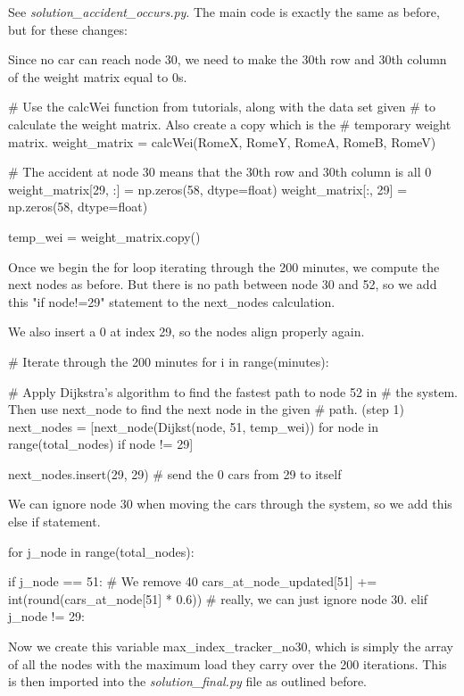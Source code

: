 \documentclass[paper=a4, fontsize=12pt]{scrartcl} %
\numberwithin{equation}{section}       %
\numberwithin{figure}{section}         %
\numberwithin{table}{section}          %
\begin{document}
\begin{enumerate}
See \textit{solution\_accident\_occurs.py}. The main code is exactly the same as before, but for these changes:

Since no car can reach node 30, we need to make the 30th row and 30th column of the weight matrix equal to 0s. 

\begin{python}
# Use the calcWei function from tutorials, along with the data set given
# to calculate the weight matrix. Also create a copy which is the
# temporary weight matrix.
weight_matrix = calcWei(RomeX, RomeY, RomeA, RomeB, RomeV)

# The accident at node 30 means that the 30th row and 30th column is all 0
weight_matrix[29, :] = np.zeros(58, dtype=float)
weight_matrix[:, 29] = np.zeros(58, dtype=float)

temp_wei = weight_matrix.copy()
\end{python}

Once we begin the for loop iterating through the 200 minutes, we compute the next nodes as before. But there is no path between node 30 and 52, so we add this "if node!=29" statement to the next\_nodes calculation.

We also insert a 0 at index 29, so the nodes align properly again.

\begin{python}
# Iterate through the 200 minutes
for i in range(minutes):

    # Apply Dijkstra's algorithm to find the fastest path to node 52 in
    # the system. Then use next_node to find the next node in the given
    # path. (step 1)
    next_nodes = [next_node(Dijkst(node, 51, temp_wei))
                  for node in range(total_nodes) if node != 29]

    next_nodes.insert(29, 29)  # send the 0 cars from 29 to itself
\end{python}

We can ignore node 30 when moving the cars through the system, so we add this else if statement.

\begin{python}
 for j_node in range(total_nodes):

        if j_node == 51:
            # We remove 40%
            cars_at_node_updated[51] += int(round(cars_at_node[51] * 0.6))
            # really, we can just ignore node 30.
        elif j_node != 29:
\end{python}

Now we create this variable max\_index\_tracker\_no30, which is simply the array of all the nodes with the maximum load they carry over the 200 iterations. This is then imported into the \textit{solution\_final.py} file as outlined before.


\end{enumerate}
\end{document}
